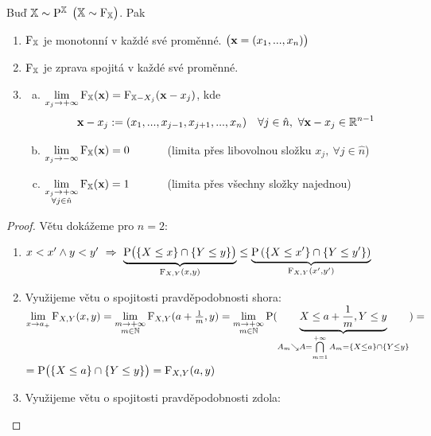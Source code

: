 \begin{theorem}
	Buď $\mathbb{X}\sim \mathrm{P}^{\mathbb{X}}$  $ \bigl(\mathbb{X}\sim \mathrm{F}_{\mathbb{X}}\bigr)$. Pak \begin{enumerate}[D1)]
		\item $\mathrm{F}_{\mathbb{X}}$ je monotonní v každé své proměnné. $\bigl(\textbf{x}=(x_1,...,x_n)\bigr)$
		\item $\mathrm{F}_{\mathbb{X}}$ je zprava spojitá v každé své proměnné.
		\item \begin{enumerate}[a)]
			\item $\lim\limits_{x_j \to +\infty} \mathrm{F}_{\mathbb{X}}(\textbf{x})=\mathrm{F}_{\mathbb{X}-X_j}(\textbf{x}-x_j)$, kde$$\textbf{x}-x_j := (x_1,...,x_{j-1},x_{j+1},...,x_n)~~~\forall j\in \hat{n},~\forall \textbf{x}-x_j \in \mathbb{R}^{n-1}$$
			\item $\lim\limits_{x_j \to -\infty} \mathrm{F}_{\mathbb{X}}(\textbf{x})=0$ ~~~~~~(limita přes libovolnou složku $ x_j,~\forall j\in \hat{n}$)
			\item $\lim\limits_{\substack{
			x_j \to +\infty	\\ \forall j \in \hat{n}
			} } \mathrm{F}_{\mathbb{X}}(\textbf{x})=1$ ~~~~~~(limita přes všechny složky najednou)
		\end{enumerate}
	\end{enumerate}
\begin{proof} Větu dokážeme pro $n=2$:
	\begin{enumerate}[D1)]
		\item $ x<x' \wedge y<y' ~\Rightarrow~ \underbrace{\mathrm{P} \bigl(\{ X \leq x \} \cap \{ Y \leq y \}\bigr) }_{\mathrm{F}_{X,Y}(x,y)} \leq \underbrace{\mathrm{P}\left( \{ X \leq x' \} \cap \{ Y \leq y' \} \right)}_{\mathrm{F}_{X,Y}(x',y')}$
		\item Využijeme větu o spojitosti pravděpodobnosti shora: \newline$
		\lim\limits_{x\to a_+} \mathrm{F}_{X,Y}(x,y)= \lim\limits_{\substack{ m\to +\infty \\ m\in\mathbb{N}}} \mathrm{F}_{X,Y}(a+\frac{1}{m},y) = \lim\limits_{\substack{ m\to +\infty \\ m\in\mathbb{N}}} \mathrm{P}(\underbrace{X \leq a+\frac{1}{m},Y \leq y}_{A_m\searrow A=\bigcap\limits_{m=1}^{+\infty} A_m=\{ X\leq a \}\cap \{ Y\leq y \}})=$\newline
		$=\mathrm{P}\bigl(\{ X\leq a \}\cap \{ Y\leq y \}\bigr)=\mathrm{F}_{X,Y}(a,y)$
		\item Využijeme větu o spojitosti pravděpodobnosti zdola: 
\end{enumerate}
\end{proof}
\end{theorem}
